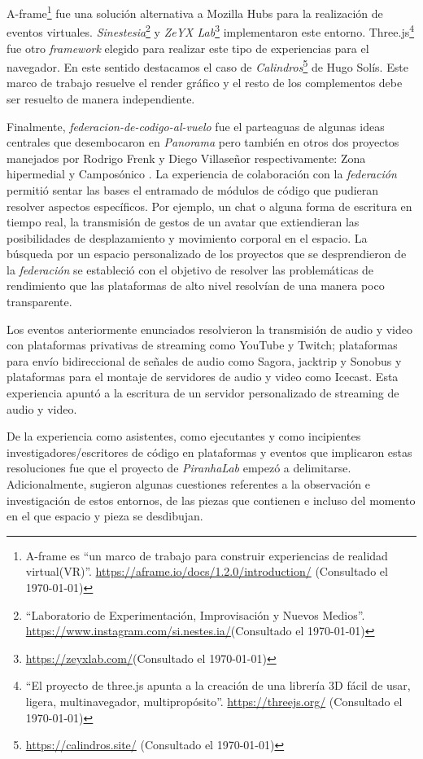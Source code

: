 A-frame\footnote{ A-frame es ``un marco de trabajo para construir experiencias de realidad virtual(VR)''. \url{https://aframe.io/docs/1.2.0/introduction/} (Consultado el \today)} fue una solución alternativa a Mozilla Hubs para la realización de eventos virtuales. \textit{Sinestesia}\footnote{``Laboratorio de Experimentación, Improvisación y Nuevos Medios''. \url{https://www.instagram.com/si.nestes.ia/}(Consultado el \today)} y \textit{ZeYX Lab}\footnote{\url{https://zeyxlab.com/}(Consultado el \today)} implementaron este entorno. Three.js\footnote{``El proyecto de three.js apunta a la creación de una librería 3D fácil de usar, ligera, multinavegador, multipropósito''. \url{https://threejs.org/} (Consultado el \today)} fue otro \textit{framework} elegido para realizar este tipo de experiencias para el navegador. En este sentido destacamos el caso de \textit{Calindros}\footnote{\url{https://calindros.site/} (Consultado el \today)} de Hugo Solís. Este marco de trabajo resuelve el render gráfico y el resto de los complementos debe ser resuelto de manera independiente. %

Finalmente, \textit{federacion-de-codigo-al-vuelo} \citep{en-vivo} fue el parteaguas de algunas ideas centrales que desembocaron en \textit{Panorama} pero también en otros dos proyectos manejados por Rodrigo Frenk y Diego Villaseñor respectivamente: Zona hipermedial y Camposónico \citep{camposonico}. La experiencia de colaboración con la \textit{federación} permitió sentar las bases el entramado de módulos de código que pudieran resolver aspectos específicos. Por ejemplo,  un chat o alguna forma de escritura en tiempo real, la transmisión de gestos de un avatar que extiendieran las posibilidades de desplazamiento y movimiento corporal en el espacio. La búsqueda por un espacio personalizado de los proyectos que se desprendieron de la \textit{federación} se estableció con el objetivo de resolver las problemáticas de rendimiento que las plataformas de alto nivel resolvían de una manera poco transparente. 

Los eventos anteriormente enunciados resolvieron la transmisión de audio y video con  plataformas privativas de streaming como YouTube y Twitch; plataformas para envío bidireccional de señales de audio como Sagora, jacktrip y Sonobus y plataformas para el montaje de servidores de audio y video como Icecast. Esta experiencia apuntó a la escritura de un servidor personalizado de streaming de audio y video. %

De la experiencia como asistentes, como ejecutantes y como incipientes investigadores/escritores de código en plataformas y eventos que implicaron estas resoluciones fue que el proyecto de \textit{PiranhaLab} empezó a delimitarse. Adicionalmente, sugieron algunas cuestiones referentes a la observación e investigación de estos entornos, de las piezas que contienen e incluso del momento en el que espacio y pieza se desdibujan. 
